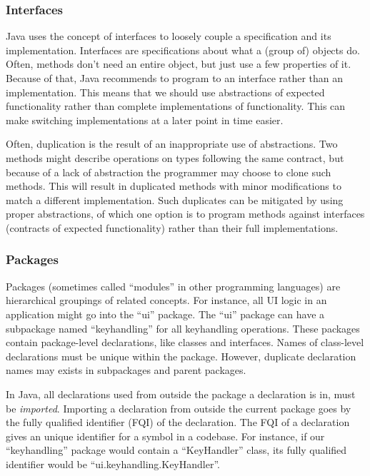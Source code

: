 \subsubsection{Interfaces}
Java uses the concept of interfaces to loosely couple a specification and its implementation. Interfaces are specifications about what a (group of) objects do. Often, methods don't need an entire object, but just use a few properties of it. Because of that, Java recommends to program to an interface rather than an implementation. This means that we should use abstractions of expected functionality rather than complete implementations of functionality. This can make switching implementations at a later point in time easier.

Often, duplication is the result of an inappropriate use of abstractions. Two methods might describe operations on types following the same contract, but because of a lack of abstraction the programmer may choose to clone such methods. This will result in duplicated methods with minor modifications to match a different implementation. Such duplicates can be mitigated by using proper abstractions, of which one option is to program methods against interfaces (contracts of expected functionality) rather than their full implementations.

\subsubsection{Packages}
Packages (sometimes called ``modules'' in other programming languages) are hierarchical groupings of related concepts. For instance, all UI logic in an application might go into the ``ui'' package. The ``ui'' package can have a subpackage named ``keyhandling'' for all keyhandling operations. These packages contain package-level declarations, like classes and interfaces. Names of class-level declarations must be unique within the package. However, duplicate declaration names may exists in subpackages and parent packages.

In Java, all declarations used from outside the package a declaration is in, must be \textit{imported}. Importing a declaration from outside the current package goes by the fully qualified identifier (FQI) of the declaration. The FQI of a declaration gives an unique identifier for a symbol in a codebase. For instance, if our ``keyhandling'' package would contain a ``KeyHandler'' class, its fully qualified identifier would be ``ui.keyhandling.KeyHandler''.

